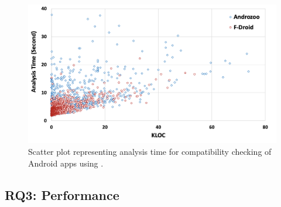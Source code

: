\begin{figure}[b]
    \centering
    \vspace{-0.5cm}
    \includegraphics[width=0.8\linewidth]{images/scatterplot.png}
    \vspace{-0.4cm}
    \caption{Scatter plot representing analysis time for compatibility checking of Android apps using \@approach.}
    \label{fig:scatterplot}
\end{figure}


\subsection{RQ3: Performance} %

